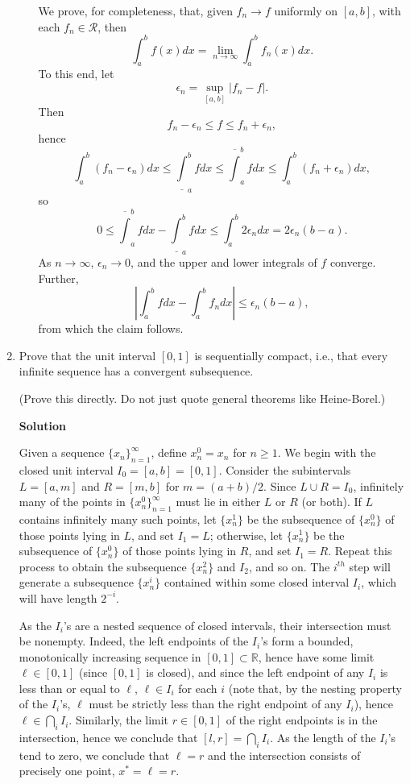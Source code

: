 \documentclass{article}
\begin{document}
\begin{enumerate}
\begin{enumerate}
We prove, for completeness, that, given \(f_n \to f\) uniformly on \([a,b]\), with each \(f_n \in \mathcal{R}\), then
\[\int_a^b f(x) dx = \lim_{n \to \infty} \int_a^b f_n(x) dx.\]
To this end, let
\[\epsilon_n = \sup_{[a,b]} \left| f_n - f \right|.\]
Then
\[f_n - \epsilon_n \leq f \leq f_n + \epsilon_n,\]
hence
\[\int_a^b (f_n - \epsilon_n) dx
  \leq \underline{\int}_a^b f dx
  \leq \overline{\int}_a^b f dx
  \leq \int_a^b (f_n + \epsilon_n) dx,\]
so
\[0 \leq \overline{\int}_a^b f dx - \underline{\int}_a^b f dx
    \leq \int_a^b 2\epsilon_n dx
       = 2 \epsilon_n (b - a).\]
As \(n \to \infty\), \(\epsilon_n \to 0\), and the upper and lower integrals of \(f\) converge.  Further,
\[\left| \int_a^b f dx - \int_a^b f_n dx \right| \leq \epsilon_n (b - a),\]
from which the claim follows.

\end{enumerate}



\item  Prove that the unit interval \([0,1]\) is sequentially compact, i.e., that every infinite sequence has a convergent subsequence.

(Prove this directly.  Do not just quote general theorems like Heine-Borel.)

{\bf Solution}

Given a sequence \(\{x_n\}_{n = 1}^{\infty}\), define \(x_n^0 = x_n\) for \(n \geq 1\).  We begin with the closed unit interval \(I_0 = [a, b] = [0, 1]\).  Consider the subintervals \(L = [a, m]\) and \(R = [m, b]\) for \(m = (a + b)/2\).  Since \(L \cup R = I_0\), infinitely many of the points in \(\{x_n^0\}_{n = 1}^{\infty}\) must lie in either \(L\) or \(R\) (or both).  If \(L\) contains infinitely many such points, let \(\{x_n^1\}\) be the subsequence of \(\{x_n^0\}\) of those points lying in \(L\), and set \(I_1 = L\); otherwise, let \(\{x_n^1\}\) be the subsequence of \(\{x_n^0\}\) of those points lying in \(R\), and set \(I_1 = R\).  Repeat this process to obtain the subsequence \(\{x_n^2\}\) and \(I_2\), and so on.  The \(i^{th}\) step will generate a subsequence \(\{x_n^i\}\) contained within some closed interval \(I_i\), which will have length \(2^{-i}\).

As the \(I_i\)'s are a nested sequence of closed intervals, their intersection must be nonempty.  Indeed, the left endpoints of the \(I_i\)'s form a bounded, monotonically increasing sequence in \([0,1] \subset \mathbb{R}\), hence have some limit \(\ell \in [0,1]\) (since \([0,1]\) is closed), and since the left endpoint of any \(I_i\) is less than or equal to \(\ell\), \(\ell \in I_i\) for each \(i\) (note that, by the nesting property of the \(I_i\)'s, \(\ell\) must be strictly less than the right endpoint of any \(I_i\)), hence \(\ell \in \bigcap_i I_i\).  Similarly, the limit \(r \in [0,1]\) of the right endpoints is in the intersection, hence we conclude that \([l,r] = \bigcap_i I_i\).  As the length of the \(I_i\)'s tend to zero, we conclude that \(\ell = r\) and the intersection consists of precisely one point, \(x^* = \ell = r\).


\end{enumerate}
\end{document}

